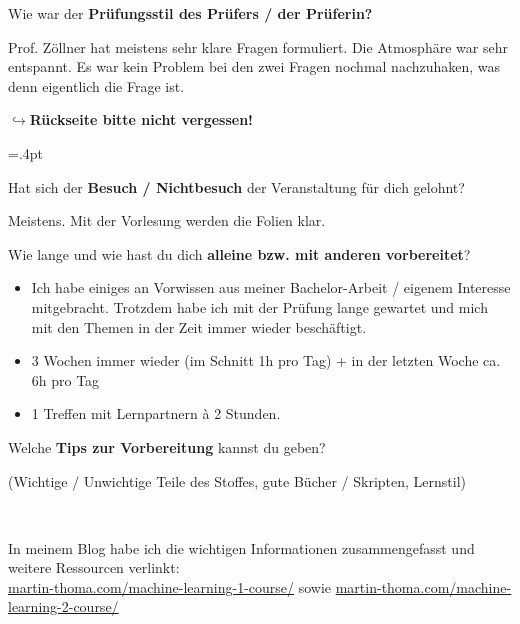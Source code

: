 \documentclass[a4paper]{article}
\begin{document}
 \textbf{} Wie war der \textbf{Prüfungsstil des Prüfers / der Prüferin?} \\
 \begin{minipage}[t][10cm]{\linewidth}
Prof. Zöllner hat meistens sehr klare Fragen formuliert.
 Die Atmosphäre war sehr entspannt. Es war kein Problem bei den zwei Fragen
 nochmal nachzuhaken, was denn eigentlich die Frage ist.


 \end{minipage}

 \begin{flushright}$\hookrightarrow$\textbf{Rückseite bitte nicht vergessen!}\end{flushright}

 \newpage
 \columnseprule=.4pt

 \begin{multicols}{2}

   Hat sich der \textbf{Besuch / Nichtbesuch} der Veranstaltung für dich gelohnt? \\
  \begin{minipage}[t][6.8cm]{\linewidth}
    Meistens. Mit der Vorlesung werden die Folien klar.

  \end{minipage}

   Wie lange und wie hast du dich \textbf{alleine bzw. mit anderen vorbereitet}? \\
  \begin{minipage}[t][7cm]{\linewidth}

    \begin{itemize}
        \item Ich habe einiges an Vorwissen aus meiner Bachelor-Arbeit /
              eigenem Interesse mitgebracht. Trotzdem habe ich mit der Prüfung
              lange gewartet und mich mit den Themen in der Zeit immer wieder
              beschäftigt.
        \item 3 Wochen immer wieder (im Schnitt 1h pro Tag) + in der letzten Woche ca. 6h pro Tag
        \item 1 Treffen mit Lernpartnern à 2 Stunden.
    \end{itemize}

  \end{minipage}

   Welche \textbf{Tips zur Vorbereitung} kannst du geben?
  \begin{footnotesize}(Wichtige / Unwichtige Teile des Stoffes, gute Bücher / Skripten, Lernstil)\end{footnotesize} \\
  \begin{minipage}[t][7cm]{\linewidth}
    In meinem Blog habe ich die wichtigen Informationen zusammengefasst und
    weitere Ressourcen verlinkt:\\
    \href{https://martin-thoma.com/machine-learning-1-course/}{martin-thoma.com/machine-learning-1-course/} sowie
    \href{https://martin-thoma.com/machine-learning-2-course/}{martin-thoma.com/machine-learning-2-course/}


\end{minipage}
\end{multicols}
\end{document}
